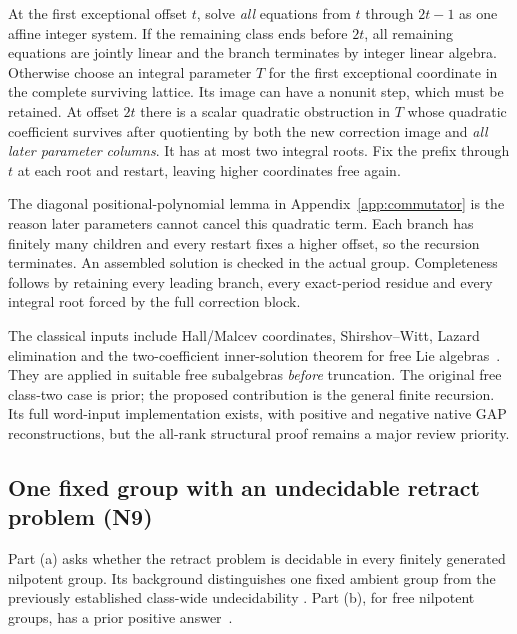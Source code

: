 At the first exceptional offset $t$, solve \emph{all} equations from
$t$ through $2t-1$ as one affine integer system. If the remaining class
ends before $2t$, all remaining equations are jointly linear and the
branch terminates by integer linear algebra. Otherwise choose an
integral parameter $T$ for the first exceptional coordinate in the
complete surviving lattice. Its image can have a nonunit step, which
must be retained. At offset $2t$ there is a scalar quadratic obstruction
in $T$ whose quadratic coefficient survives after quotienting by both
the new correction image and \emph{all later parameter columns}.
It has at most two integral roots. Fix the prefix through $t$ at
each root and restart, leaving higher coordinates free again.

The diagonal positional-polynomial lemma in
Appendix~\ref{app:commutator} is the reason later parameters cannot
cancel this quadratic term. Each branch has finitely many children
and every restart fixes a higher offset, so the recursion terminates.
An assembled solution is checked in the actual group. Completeness
follows by retaining every leading branch, every exact-period residue
and every integral root forced by the full correction block.

The classical inputs include Hall/Malcev coordinates, Shirshov--Witt,
Lazard elimination and the two-coefficient inner-solution theorem for
free Lie algebras~\cite{altassan,remeslennikov-stoehr}. They are applied
in suitable free subalgebras \emph{before} truncation. The original
free class-two case is prior; the proposed contribution is the general
finite recursion. Its full word-input implementation exists, with
positive and negative native GAP reconstructions, but the all-rank
structural proof remains a major review priority.

\subsection{One fixed group with an undecidable retract problem (N9)}\label{sec:n9}
Part (a) asks whether the retract problem is decidable in every finitely
generated nilpotent group. Its background distinguishes one fixed
ambient group from the previously established class-wide undecidability
\cite{romankov2016}. Part (b), for free nilpotent groups, has a prior
positive answer~\cite{retracts2017}.

